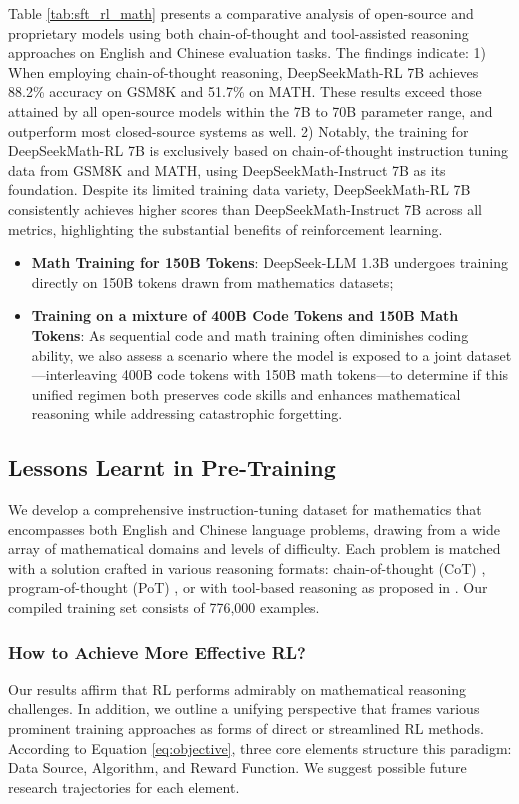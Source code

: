 Table \ref{tab:sft_rl_math} presents a comparative analysis of open-source and proprietary models using both chain-of-thought and tool-assisted reasoning approaches on English and Chinese evaluation tasks. The findings indicate: 1) When employing chain-of-thought reasoning, DeepSeekMath-RL 7B achieves 88.2\% accuracy on GSM8K and 51.7\% on MATH. These results exceed those attained by all open-source models within the 7B to 70B parameter range, and outperform most closed-source systems as well. 2) Notably, the training for DeepSeekMath-RL 7B is exclusively based on chain-of-thought instruction tuning data from GSM8K and MATH, using DeepSeekMath-Instruct 7B as its foundation. Despite its limited training data variety, DeepSeekMath-RL 7B consistently achieves higher scores than DeepSeekMath-Instruct 7B across all metrics, highlighting the substantial benefits of reinforcement learning.

\begin{itemize}[topsep=0pt]
    \item \textbf{Math Training for 150B Tokens}: DeepSeek-LLM 1.3B undergoes training directly on 150B tokens drawn from mathematics datasets;
    \item \textbf{Training on a mixture of 400B Code Tokens and 150B Math Tokens}: As sequential code and math training often diminishes coding ability, we also assess a scenario where the model is exposed to a joint dataset—interleaving 400B code tokens with 150B math tokens—to determine if this unified regimen both preserves code skills and enhances mathematical reasoning while addressing catastrophic forgetting.
\end{itemize}

\subsection{Lessons Learnt in Pre-Training}

We develop a comprehensive instruction-tuning dataset for mathematics that encompasses both English and Chinese language problems, drawing from a wide array of mathematical domains and levels of difficulty. Each problem is matched with a solution crafted in various reasoning formats: chain-of-thought (CoT) \citep{cot}, program-of-thought (PoT) \citep{pot,pal}, or with tool-based reasoning as proposed in \citep{tora}. Our compiled training set consists of 776,000 examples.

\subsubsection{How to Achieve More Effective RL?}
\label{sec:effec_rl}
Our results affirm that RL performs admirably on mathematical reasoning challenges. In addition, we outline a unifying perspective that frames various prominent training approaches as forms of direct or streamlined RL methods. According to Equation \ref{eq:objective}, three core elements structure this paradigm: Data Source, Algorithm, and Reward Function. We suggest possible future research trajectories for each element.

